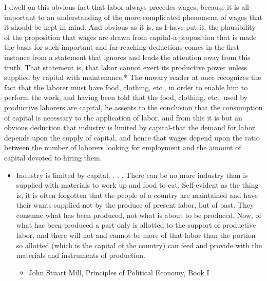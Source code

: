 I dwell on this obvious fact that labor always precedes wages, because
it is all-important to an understanding of the more complicated
phenomena of wages that it should be kept in mind. And obvious as it is,
as I have put it, the plausibility of the proposition that wages are
drawn from capital-a proposition that is made the basis for such
important and far-reaching deductions-comes in the first instance from a
statement that ignores and leads the attention away from this truth.
That statement is, that labor cannot exert its productive power unless
supplied by capital with maintenance.* The unwary reader at once
recognizes the fact that the laborer must have food, clothing, etc., in
order to enable him to perform the work, and having been told that the
food, clothing, etc., used by productive laborers are capital, he
assents to the conclusion that the consumption of capital is necessary
to the application of labor, and from this it is but an obvious
deduction that industry is limited by capital-that the demand for labor
depends upon the supply of capital, and hence that wages depend upon the
ratio between the number of laborers looking for employment and the
amount of capital devoted to hiring them.

\begin{itemize}
\item
  Industry is limited by capital. . . . There can be no more industry
  than is supplied with materials to work up and food to eat.
  Self-evident as the thing is, it is often forgotten that the people of
  a country are maintained and have their wants supplied not by the
  produce of present labor, but of past. They consume what has been
  produced, not what is about to be produced. Now, of what has been
  produced a part only is allotted to the support of productive labor,
  and there will not and cannot be more of that labor than the portion
  so allotted (which is the capital of the country) can feed and provide
  with the materials and instruments of production.

  \begin{itemize}
  \tightlist
  \item
    John Stuart Mill, Principles of Political Economy, Book I
  \end{itemize}
\end{itemize}

